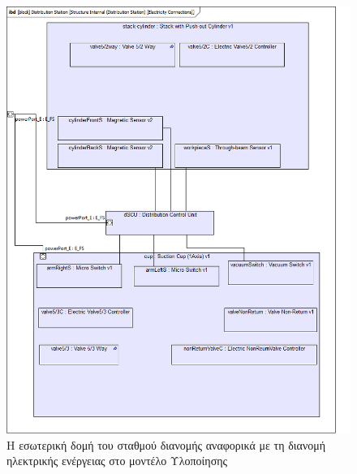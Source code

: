 \documentclass[a4paper,12pt,twoside]{report}
\begin{document}
\begin{appendices}
				\begin{figure}[hp]
					\centering
					\includegraphics[scale=0.50]{DesignModel_StructureInternal(DistributionStation)[ElectricityConnections].png}
					\caption{Η εσωτερική δομή του σταθμού διανομής αναφορικά με τη διανομή ηλεκτρικής ενέργειας στο μοντέλο Υλοποίησης}
					\label{φωτ:Η εσωτερική δομή του σταθμού διανομής αναφορικά με τη διανομή ηλεκτρικής ενέργειας στο μοντέλο Υλοποίησης}
				\end{figure}
				

\end{appendices}
\end{document}

